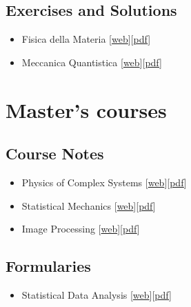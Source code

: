 \documentclass{article}
\begin{document}
\subsection{Exercises and Solutions}

\begin{itemize}
    \item Fisica della Materia [\href{source/b_exercises_soluzioni_materia.html}{web}][\href{https://github.com/Grufoony/Fisica_Unibo/tree/gh-pages/source/b_exercises_soluzioni_materia.pdf}{pdf}]
    \item Meccanica Quantistica [\href{source/b_exercises_soluzioni_meccanica_quantistica.html}{web}][\href{https://github.com/Grufoony/Fisica_Unibo/tree/gh-pages/source/b_exercises_soluzioni_meccanica_quantistica.pdf}{pdf}]
\end{itemize}

\section{Master's courses}

\subsection{Course Notes}

\begin{itemize}
    \item Physics of Complex Systems [\href{source/m_physics_of_complex_systems.html}{web}][\href{https://github.com/Grufoony/Fisica_Unibo/tree/gh-pages/source/m_physics_of_complex_systems.pdf}{pdf}]
    \item Statistical Mechanics [\href{source/m_statistical_mechanics.html}{web}][\href{https://github.com/Grufoony/Fisica_Unibo/tree/gh-pages/source/m_statistical_mechanics.pdf}{pdf}]
    \item Image Processing [\href{source/m_image_processing.html}{web}][\href{https://github.com/Grufoony/Fisica_Unibo/tree/gh-pages/source/m_image_processing.pdf}{pdf}]
\end{itemize}

\subsection{Formularies}

\begin{itemize}
    \item Statistical Data Analysis [\href{source/m_formulary_statistical_data_analysis.html}{web}][\href{https://github.com/Grufoony/Fisica_Unibo/tree/gh-pages/source/m_formulary_statistical_data_analysis.pdf}{pdf}]
\end{itemize}
\end{document}

